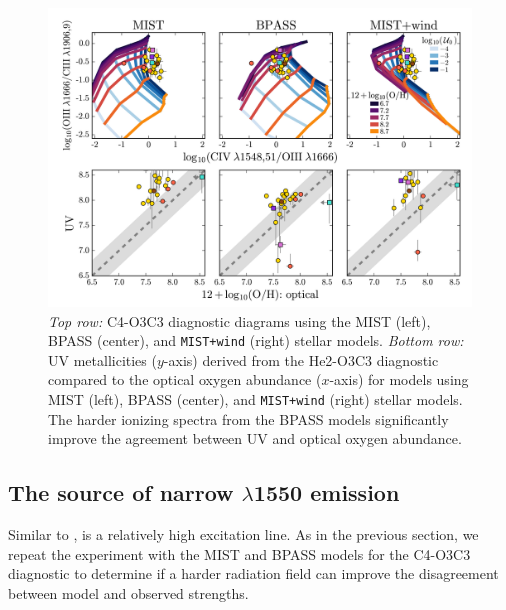 \documentclass[trackchanges, preprint2]{aastex62}
\newcommand{\heii}{\ion{He}{2}}
\newcommand{\civ}{\ion{C}{4}}
\begin{document}
\begin{figure}
  \begin{center}
    \includegraphics[width=\linewidth]{figs/f9.png}
    \caption{\emph{Top row:} C4-O3C3 diagnostic diagrams using the MIST (left), BPASS (center), and {\tt MIST+wind} (right) stellar models. \emph{Bottom row:} UV metallicities ($y$-axis) derived from the He2-O3C3 diagnostic compared to the optical oxygen abundance ($x$-axis) for models using MIST (left), BPASS (center), and {\tt MIST+wind} (right) stellar models. The harder ionizing spectra from the BPASS models significantly improve the agreement between UV and optical oxygen abundance.}
    \label{fig:CIVdds}
  \end{center}
\end{figure}

\subsection{The source of narrow \civ$\lambda$1550 emission} \label{sec:discussion:CIV}

Similar to \heii{}, \civ{} is a relatively high excitation line. As in the previous section, we repeat the experiment with the MIST and BPASS models for the C4-O3C3 diagnostic to determine if a harder radiation field can improve the disagreement between model and observed \civ{} strengths.
\end{document}
